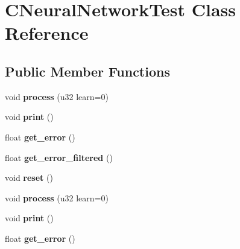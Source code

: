\hypertarget{classCNeuralNetworkTest}{\section{C\-Neural\-Network\-Test Class Reference}
\label{classCNeuralNetworkTest}
}
\subsection*{Public Member Functions}
\begin{DoxyCompactItemize}
\item 
\hypertarget{classCNeuralNetworkTest_aec375092f4b240bbd835e32616f90342}{void {\bfseries process} (u32 learn=0)}\label{classCNeuralNetworkTest_aec375092f4b240bbd835e32616f90342}

\item 
\hypertarget{classCNeuralNetworkTest_a1a6a10238372e72bc8dd53f661ae0f45}{void {\bfseries print} ()}\label{classCNeuralNetworkTest_a1a6a10238372e72bc8dd53f661ae0f45}

\item 
\hypertarget{classCNeuralNetworkTest_afe99dc3b234a360934ead8264e2f6ec4}{float {\bfseries get\-\_\-error} ()}\label{classCNeuralNetworkTest_afe99dc3b234a360934ead8264e2f6ec4}

\item 
\hypertarget{classCNeuralNetworkTest_a2f47abbe377dc9f7332e80810ffbe83c}{float {\bfseries get\-\_\-error\-\_\-filtered} ()}\label{classCNeuralNetworkTest_a2f47abbe377dc9f7332e80810ffbe83c}

\item 
\hypertarget{classCNeuralNetworkTest_adbae2092b29d885acca7e2ee4e5e9434}{void {\bfseries reset} ()}\label{classCNeuralNetworkTest_adbae2092b29d885acca7e2ee4e5e9434}

\item 
\hypertarget{classCNeuralNetworkTest_aec375092f4b240bbd835e32616f90342}{void {\bfseries process} (u32 learn=0)}\label{classCNeuralNetworkTest_aec375092f4b240bbd835e32616f90342}

\item 
\hypertarget{classCNeuralNetworkTest_a1a6a10238372e72bc8dd53f661ae0f45}{void {\bfseries print} ()}\label{classCNeuralNetworkTest_a1a6a10238372e72bc8dd53f661ae0f45}

\item 
\hypertarget{classCNeuralNetworkTest_afe99dc3b234a360934ead8264e2f6ec4}{float {\bfseries get\-\_\-error} ()}\label{classCNeuralNetworkTest_afe99dc3b234a360934ead8264e2f6ec4}


\end{DoxyCompactItemize}
